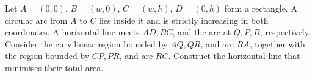 Let $A=(0,0)$, $B=(w,0)$, $C=(w,h)$, $D=(0,h)$ form a rectangle. A circular arc from $A$ to $C$ lies inside it and is strictly increasing in both coordinates. A horizontal line meets $AD,BC$, and the arc at $Q,P,R$, respectively. Consider the curvilinear region bounded by $AQ,QR$, and arc $RA$, together with the region bounded by $CP,PR$, and arc $RC$. Construct the horizontal line that minimises their total area.
